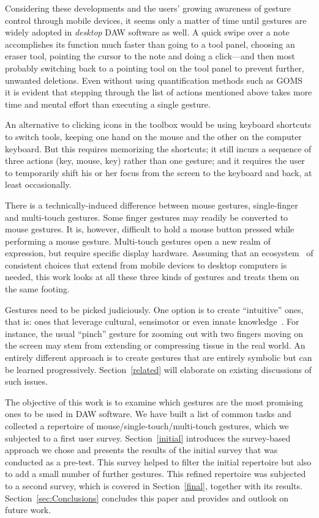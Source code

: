 \documentclass{aes130}
\begin{document}
Considering these developments and the users' growing awareness of gesture control through mobile devices, it seems only a matter of time until gestures are widely adopted in {\em desktop} DAW software as well. A quick swipe over a note accomplishes its function much faster than going to a tool panel, choosing an eraser tool, pointing the cursor to the note and doing a click---and then most probably switching back to a pointing tool on the tool panel to prevent further, unwanted deletions. Even without using quantification methods such as GOMS~\cite{Card:1983:PHI:578027} it is evident that stepping through the list of actions mentioned above takes more time and mental effort than executing a single gesture. 

An alternative to clicking icons in the toolbox would be using keyboard shortcuts to switch tools, keeping one hand on the mouse and the other on the computer keyboard. But this requires memorizing the shortcuts; it still incurs a sequence of three actions (key, mouse, key) rather than one gesture; and it requires the user to temporarily shift his or her focus from the screen to the keyboard and back, at least occasionally.

There is a technically-induced difference between mouse gestures, single-finger and multi-touch gestures. Some finger gestures may readily be converted to mouse gestures. It is, however, difficult to hold a mouse button pressed while performing a mouse gesture. Multi-touch gestures open a new realm of expression, but require specific display hardware. Assuming that an ecosystem~\cite{fatigue} of consistent choices that extend from mobile devices to desktop computers is needed, this work looks at all these three kinds of gestures and treats them on the same footing.

Gestures need to be picked judiciously. One option is to create ``intuitive'' ones, that is: ones that leverage cultural, sensimotor or even innate knowledge~\cite{Naumann:2007:IUU:1784197.1784212}. For instance, the usual ``pinch'' gesture for zooming out with two fingers moving on the screen may stem from extending or compressing tissue in the real world. An entirely different approach is to create gestures that are entirely symbolic but can be learned progressively. Section~\ref{related} will elaborate on existing discussions of such issues. 

The objective of this work is to examine which gestures are the most promising ones to be used in DAW software. We have built a list of common tasks and collected a repertoire of mouse/single-touch/multi-touch gestures, which we subjected to a first user survey. Section~\ref{initial} introduces the survey-based approach we chose and presents the results of the initial survey that was conducted as a pre-test. This survey helped to filter the initial repertoire but also to add a small number of further gestures. This refined repertoire was subjected to a second survey, which is covered in Section~\ref{final}, together with its results. Section~\ref{sec:Conclusions} concludes this paper and provides and outlook on future work.
\end{document}
